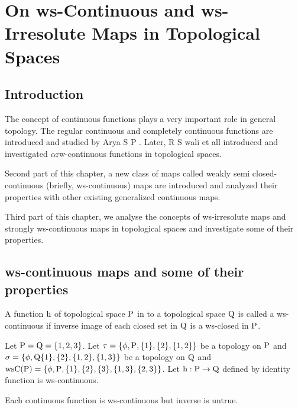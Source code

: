 \chapter{On ws-Continuous and ws-Irresolute Maps in Topological Spaces}
\graphicspath{{Chapter3/Chapter3Figs/EPS/}{Chapter3/Chapter3Figs/}}

\section{Introduction}\label{sec3.1}

The concept of continuous functions plays a very important role in general topology. The regular continuous and completely continuous functions are introduced and studied by Arya S P \cite{key2}. Later, R S wali et all \cite{key31} introduced and investigated $\alpha$rw-continuous functions in topological spaces.

Second part of this chapter, a new class of maps called weakly semi closed-continuous (briefly, ws-continuous) maps are introduced and analyzed their properties with other existing generalized continuous maps.

Third part of this chapter, we analyse the concepts of ws-irresolute maps and strongly ws-continuous maps in topological spaces and investigate some of their properties.

\section{ws-continuous maps and some of their properties}\label{sec3.2}

\begin{dfn}\label{defi3.2.1}
A function $\mathrm{h}$ of topological space $\mathrm{P}$ in to a topological space $\mathrm{Q}$ is called a ws-continuous if inverse image of each closed set in $\mathrm{Q}$ is a ws-closed in $\mathrm{P}$.
\end{dfn}

\begin{exm}\label{exam3.2.2}
Let $\mathrm{P}=\mathrm{Q}= \{1, 2, 3\}$. Let $\tau = \{\phi, \mathrm{P}, \{1\}, \{2\}, \{1, 2\}\}$ be a topology on $\mathrm{P}$ and $\sigma = \{\phi, \mathrm{Q} \{1\}, \{2\}, \{1, 2\}, \{1, 3\}\}$ be a topology on $\mathrm{Q}$ and $\mathrm{ws}\mathrm{C}(\mathrm{P}) = \{\phi, \mathrm{P}, \{1\}, \{2\},\{3\}, \{1, 3\},\{2, 3\}\}$. Let $\mathrm{h}: \mathrm{P}\to \mathrm{Q}$ defined by identity function is ws-continuous.
\end{exm}

\begin{thm}\label{thm3.2.3}
Each continuous function is ws-continuous but inverse is untrue.
\end{thm}

